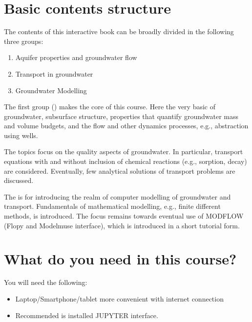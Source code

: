 \documentclass[letterpaper,10pt,english]{jupyterBook}
\begin{document}
\section{Basic contents structure}
\label{\detokenize{content/background/00_general:basic-contents-structure}}
\sphinxAtStartPar
The contents of this interactive book can be broadly divided in the following three groups:
\begin{enumerate}
%
\item {} 
\sphinxAtStartPar
Aquifer properties and groundwater flow

\item {} 
\sphinxAtStartPar
Transport in groundwater

\item {} 
\sphinxAtStartPar
Groundwater Modelling

\end{enumerate}

\sphinxAtStartPar
The first group () makes the core of this course. Here the very basic of groundwater, subsurface structure, properties that quantify groundwater mass and volume budgets, and the flow and other dynamics processes, e.g., abstraction using wells.

\sphinxAtStartPar
The  topics focus on the quality aspects of groundwater. In particular, transport equations with and without inclusion of chemical reactions (e.g., sorption, decay) are considered. Eventually, few analytical solutions of transport problems are discussed.

\sphinxAtStartPar
The  is for introducing the realm of computer modelling of groundwater and transport. Fundamentals of mathematical modelling, e.g., finite different methods, is introduced. The focus remains towards eventual use of MODFLOW (Flopy and Modelmuse interface), which is introduced in a short tutorial form.


\section{What do you need in this course?}
\label{\detokenize{content/background/00_general:what-do-you-need-in-this-course}}
\sphinxAtStartPar
You will need the following:
\begin{itemize}
\item {} 
\sphinxAtStartPar
Laptop/Smartphone/tablet more convenient with internet connection

\item {} 
\sphinxAtStartPar
Recommended is installed JUPYTER interface.

\end{itemize}
\end{document}
